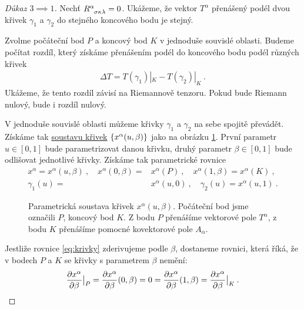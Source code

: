 \documentclass{article}
\begin{document}
\begin{proof}[Důkaz $3 \implies 1$]
    Nechť $R\indices{^\alpha_\sigma_\kappa_\lambda} = 0$. Ukážeme, že vektor $T^\alpha$ přenášený podél dvou křivek $\gamma_1$ a $\gamma_2$ do stejného koncového bodu je stejný. 
    
    Zvolme počáteční bod $P$ a koncový bod $K$ v jednoduše souvislé oblasti.
    Budeme počítat rozdíl, který získáme přenášením podél do koncového bodu podél různých křivek
    \begin{align}
        \Delta T = T(\gamma_1)|_K - T(\gamma_2)|_K \:.
    \end{align}
    Ukážeme, že tento rozdíl závisí na Riemannově tenzoru. Pokud bude Riemann nulový, bude i rozdíl nulový.
    
    V jednoduše souvislé oblasti můžeme křivky $\gamma_1$ a $\gamma_2$ na sebe spojitě převádět. Získáme tak \underline{soustavu křivek} $\left \lbrace x^\alpha(u,\beta) \right \rbrace$ jako na obrázku \ref{fig:soustava}. První parametr $u \in [0,1]$ bude parametrizovat danou křivku, druhý parametr $\beta \in [0,1]$ bude odlišovat jednotlivé křivky. Získáme tak parametrické rovnice
    \begin{align}
        x^\alpha = x^\alpha(u,\beta) \:, \quad x^\alpha(0,\beta) =& x^\alpha(P) \:, \quad x^\alpha(1,\beta) = x^\alpha(K) \:, \label{eq:krivky} \\
        \gamma_1(u) =& x^\alpha(u,0) \:, \quad \gamma_2(u) = x^\alpha(u,1) \:. 
    \end{align}

    \begin{figure}[H] 
    
        \centering
        \def\svgwidth{\columnwidth}
        
        \caption{Parametrická soustava křivek $x^\alpha(u,\beta)$. Počáteční bod jsme označili $P$, koncový bod $K$. Z bodu $P$ přenášíme vektorové pole $T^\alpha$, z bodu $K$ přenášíme pomocné kovektorové pole $A_\alpha$.}
        \label{fig:soustava}
        
        \end{figure}

    Jestliže rovnice \vref{eq:krivky} zderivujeme podle $\beta$, dostaneme rovnici, která říká, že v bodech $P$ a $K$ se křivky s parametrem $\beta$ nemění:
    \begin{align}
        \frac{\partial x^\alpha}{\partial \beta}\big|_P = \frac{\partial x^\alpha}{\partial \beta}(0,\beta) = 0 = \frac{\partial x^\alpha}{\partial \beta}(1,\beta) = \frac{\partial x^\alpha}{\partial \beta}\big|_K  \:. \label{eq:koncove_body}
    \end{align} 


\end{proof}
\end{document}
